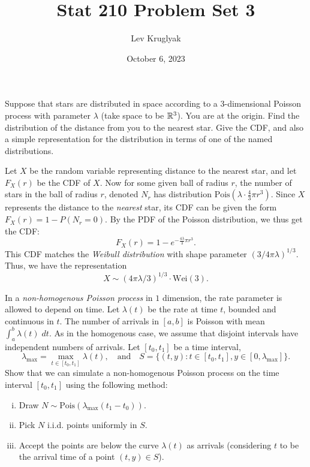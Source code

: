 \documentclass{pset}
\title{Stat 210 Problem Set 3}
\author{Lev Kruglyak}
\date{October 6, 2023}
\begin{document}
\maketitle

\begin{problem}{1}
  Suppose that stars are distributed in space according to a $3$-dimensional Poisson process with parameter $\lambda$ (take space to be $\mathbb{R}^3$). You are at the origin. Find the distribution of the distance from you to the nearest star. Give the CDF, and also a simple representation for the distribution in terms of one of the named distributions.
\end{problem}

\begin{solution}
  Let $X$ be the random variable representing distance to the nearest star, and let $F_X(r)$ be the CDF of $X$. Now for some given ball of radius $r$, the number of stars in the ball of radius $r$, denoted $N_r$ has distribution $\textrm{Pois}(\lambda\cdot \frac{4}{3}\pi r^3)$. Since $X$ represents the distance to the \emph{nearest} star, its CDF can be given the form $F_X(r) = 1-P(N_r = 0)$. By the PDF of the Poisson distribution, we thus get the CDF:
  \[F_X(r) = 1-e^{-\frac{4\lambda}{3}\pi r^3}.\]
  This CDF matches the \emph{Weibull distribution} with shape parameter $\left(3/4\pi \lambda\right)^{1/3}$. Thus, we have the representation
  \[ X \sim (4\pi \lambda /3)^{1/3}\cdot \textrm{Wei}(3).\]
\end{solution}

\begin{problem}{2}
  In a \emph{non-homogenous Poisson process} in $1$ dimension, the rate parameter is allowed to depend on time. Let $\lambda(t)$ be the rate at time $t$, bounded and continuous in $t$. The number of arrivals in $[a,b]$ is Poisson with mean $\int^b_a \lambda(t)\;dt$. As in the homogenous case, we assume that disjoint intervals have independent numbers of arrivals.
  Let $[t_0, t_1]$ be a time interval,
  \[\lambda_{\textrm{max}} = \max_{t\in [t_0, t_1]}\lambda(t),\quad\textrm{and}\quad S = \{(t,y) : t\in [t_0, t_1], y\in [0,\lambda_{\textrm{max}}]\}.\]
  Show that we can simulate a non-homogenous Poisson process on the time interval $[t_0, t_1]$ using the following method:
  \begin{enumerate}[(i)]
    \item Draw $N\sim \textrm{Pois}(\lambda_{\textrm{max}}(t_1 - t_0))$.
    \item Pick $N$ i.i.d. points uniformly in $S$.
    \item Accept the points are below the curve $\lambda(t)$ as arrivals (considering $t$ to be the arrival time of a point $(t,y)\in S$).
  \end{enumerate}
\end{problem}
\end{document}
